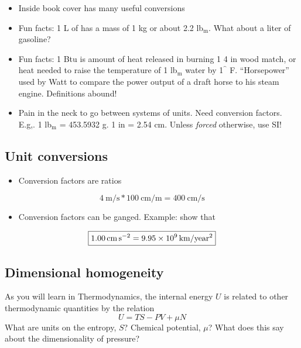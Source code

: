 \documentclass[11pt]{article}
\begin{document}
\begin{itemize}
\item Inside book cover has many useful conversions

\item Fun facts: 1 L of  has a mass of 1 kg or about 2.2 lb$_{\text{m}}$.  What about a liter of gasoline?

\item Fun facts: 1 Btu is amount of heat released in burning 1 4 in wood match, or heat needed to raise the temperature of 1 lb$_{\text{m}}$ water by 1$^{\^{}}$ F. ``Horsepower'' used by Watt to compare the power output of a draft horse to his steam engine.  Definitions abound!
\item Pain in the neck to go between systems of units.  Need conversion factors.  E.g,. 1 lb$_{\text{m}}$ = 453.5932 g.  1 in = 2.54 cm.  Unless \emph{forced} otherwise, use SI!
\end{itemize}

\subsection{Unit conversions}
\label{sec-3-4}
\begin{itemize}
\item Conversion factors are ratios
\end{itemize}

\[ \boxed{\SI[per-mode=fraction]{4}{\m\per\s} * \SI[per-mode=fraction]{100}{\cm\per\m} = \SI[per-mode=fraction]{400}{\cm\per\s}} \]

\begin{itemize}
\item Conversion factors can be ganged.  Example: show that
\end{itemize}
\[ \boxed{\SI{1.00}{\cm\per\s\squared} = \SI{9.95e9}{\km\per year\squared}} \]

\subsection{Dimensional homogeneity}
\label{sec-3-5}
\begin{framed}
\noindent As you will learn in Thermodynamics, the internal energy \(U\) is related to other thermodynamic quantities by  the relation
\begin{equation}
U = T S - P V + \mu N
\end{equation}
\noindent What are units on the entropy, \(S\)?  Chemical potential, \(\mu\)?  What does this say about the dimensionality of pressure?
\end{framed}
\end{document}

